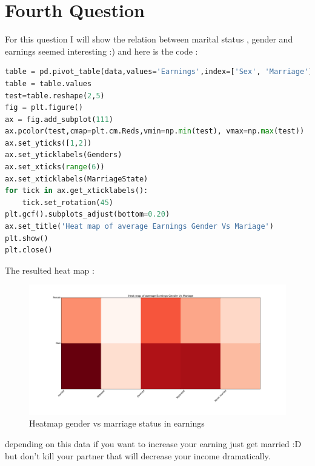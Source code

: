 \documentclass{article}
\begin{document}
\section*{Fourth Question}
For this question I will show the relation between marital status , gender and earnings seemed interesting :) and here is the code : 
\begin{lstlisting}[language=python]
table = pd.pivot_table(data,values='Earnings',index=['Sex', 'Marriage'],aggfunc=np.mean)
table = table.values
test=table.reshape(2,5)
fig = plt.figure()
ax = fig.add_subplot(111)
ax.pcolor(test,cmap=plt.cm.Reds,vmin=np.min(test), vmax=np.max(test))
ax.set_yticks([1,2])
ax.set_yticklabels(Genders)
ax.set_xticks(range(6))
ax.set_xticklabels(MarriageState)
for tick in ax.get_xticklabels():
    tick.set_rotation(45)
plt.gcf().subplots_adjust(bottom=0.20)
ax.set_title('Heat map of average Earnings Gender Vs Mariage')
plt.show()
plt.close()
\end{lstlisting}
The resulted heat map :
\begin{figure}[H]
\includegraphics[scale=0.4,trim={4cm 2.5cm 0cm 2cm},clip]{hmGME.png}
\caption{Heatmap gender vs marriage status in earnings}
\end{figure}
depending on this data if you want to increase your earning just get married :D but don't kill your partner that will decrease your income dramatically.
\end{document}
